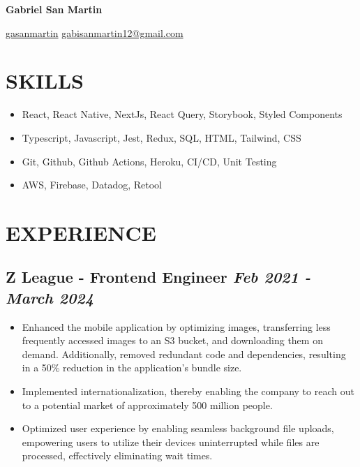 \documentclass[12pt, letterpaper]{article}
\begin{document}
\begin{center}
    \textbf{\Huge Gabriel San Martin} \\ \vspace{3pt}

    \small
    \faLinkedin \hspace{.5pt} \href{https://www.linkedin.com/in/gasanmartin}{gasanmartin}
    \vline \hspace{.5pt}
    \faEnvelope \hspace{.5pt} \href{mailto:gabisanmartin12@gmail.com}{gabisanmartin12@gmail.com}
\end{center}

\section{SKILLS}

\begin{itemize}
    \setlength\itemsep{0em}
    \item React, React Native, NextJs, React Query, Storybook, Styled Components
    \item Typescript, Javascript, Jest, Redux, SQL, HTML, Tailwind, CSS
    \item Git, Github, Github Actions, Heroku, CI/CD, Unit Testing
    \item AWS, Firebase, Datadog, Retool
\end{itemize}

\section{EXPERIENCE}

\subsection*{Z League - Frontend Engineer \hfill \small \textit{Feb 2021 - March 2024}}

\begin{itemize}
    \setlength\itemsep{0em}
    \item Enhanced the mobile application by optimizing images, transferring less frequently accessed images to an S3 bucket, and downloading them on demand. Additionally, removed redundant code and dependencies, resulting in a 50\% reduction in the application's bundle size.
    \item Implemented internationalization, thereby enabling the company to reach out to a potential market of approximately 500 million people.
    \item Optimized user experience by enabling seamless background file uploads, empowering users to utilize their devices uninterrupted while files are processed, effectively eliminating wait times.
\end{itemize}
\end{document}
